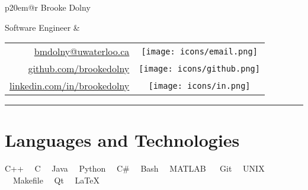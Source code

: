 \documentclass[oneside, 11pt]{memoir}
\newcommand{\TitleFont}[1]{\textnormal{\fontsize{30pt}{0}\selectfont #1}}
\newcommand{\lmr}{\fontfamily{lmr}\selectfont} %
\newcommand{\LaTeXSkill}{\lmr \LaTeX}
\newcommand{\spaceddot}[0]{~\cdot~}
\newcommand{\entrySkills}[2]{
  \begin{adjustwidth}{2.75em}{0em}%
  {\Merriweather \small #1}\spaceddot{\Merriweather \small #2}
  \end{adjustwidth}
  \vspace{-0.2em}
}
\newcommand{\github}{\texttt{[image: icons/github.png]}}
\newcommand{\linkedin}{\texttt{[image: icons/in.png]}}
\newcommand{\email}{\texttt{[image: icons/email.png]}}
\newcommand{\phone}{\texttt{[image: icons/phone.png]}}
\begin{document}
\color{textcolor}

\begin{tabular*}{\textwidth}{p{20em}@{\extracolsep{\fill}}r}%
  \TitleFont{\color{titlecolor} Brooke Dolny}

  {\textnormal{ Software Engineer}}
  &
  \begin{tabular}{rc}
    \url{bmdolny@uwaterloo.ca} & \email\\
    \url{github.com/brookedolny} & \github\\
    \url{linkedin.com/in/brookedolny} & \linkedin
    \vspace{-0.08em}
    \end{tabular}%
\end{tabular*}
{\color{titlecolor} \rule{\textwidth}{0.1em}}


\section*{Languages and Technologies}
    \entrySkills{
        C++ \spaceddot C \spaceddot Java \spaceddot Python \spaceddot C\# \spaceddot Bash
        \spaceddot MATLAB
    }{
        Git \spaceddot UNIX \spaceddot Makefile \spaceddot Qt \spaceddot \LaTeXSkill
    }



\end{document}
